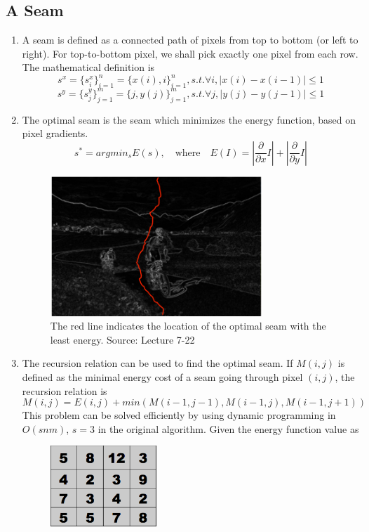 \documentclass{article}
\begin{document}
\subsection{A Seam}
\begin{enumerate}
\item A seam is defined as a connected path of pixels from top to bottom (or left to right). For top-to-bottom pixel, we shall pick exactly one pixel from each row. The mathematical definition is
$$
s^x = \{s_i^x\}_{i=1}^n = \{x(i),i\}_{i=1}^n, s.t. \forall i, |x(i) - x(i - 1)| \leq 1
$$
$$
s^y = \{s_j^y\}_{j=1}^m = \{j,y(j)\}_{j=1}^m, s.t. \forall j, |y(j) - y(j - 1)| \leq 1
$$
\item The optimal seam is the seam which minimizes the energy function, based on pixel gradients.
$$
s^{*} = argmin_s E(s), \quad \textrm{where} \quad E(I) = |\frac{\partial}{\partial x}I| + |\frac{\partial}{\partial y}I|
$$
\begin{figure}[H]
\centering
\includegraphics[width=8cm]{Optimal_Seam.png}
\caption{The red line indicates the location of the optimal seam with the least energy. Source: Lecture 7-22}
\end{figure}
\item The recursion relation can be used to find the optimal seam. If $M(i,j)$ is defined as the minimal energy cost of a seam going through pixel $(i,j)$, the recursion relation is
$$
M(i,j) = E(i,j) + min(M(i-1,j-1), M(i-1,j), M(i-1,j+1))
$$
This problem can be solved efficiently by using dynamic programming in $O(snm)$, $s=3$ in the original algorithm.
Given the energy function value as
\begin{figure}[H]
\centering
\includegraphics[width=4cm]{energy.png}

\end{figure}
\end{enumerate}
\end{document}
